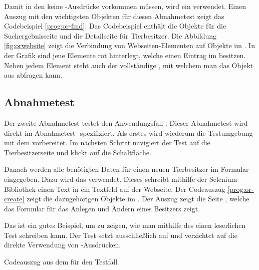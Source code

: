 \SuperPar
Damit in den  keine -Ausdrücke vorkommen müssen, wird ein  verwendet. Einen Auszug mit den wichtigsten Objekten für diesen Abnahmetest zeigt das Codebeispiel \ref{prog:or-find}. Das Codebeispiel enthält die Objekte für die Suchergebnisseite und die Detailseite für Tierbesitzer. Die Abbildung \ref{fig:orwebsite} zeigt die Verbindung von Webseiten-Elementen auf Objekte im . In der Grafik sind jene Elemente rot hinterlegt, welche einen Eintrag im  besitzen. Neben jedem Element steht auch der vollständige , mit welchem man das Objekt aus  abfragen kann.


\subsection{Abnahmetest }
\label{cha:TestenUA2}


Der zweite Abnahmetest testet den Anwendungsfall . Dieser Abnahmetest wird direkt im Abnahmetest- spezifiziert. Als erstes wird wiederum die Testumgebung mit dem   vorbereitet. Im nächsten Schritt navigiert der Test auf die Tierbesitzerseite und klickt auf die  Schaltfläche. 


\SuperPar
Danach werden alle benötigten Daten für einen neuen Tierbesitzer im Formular eingegeben. Dazu wird das   verwendet. Dieses  schreibt mithilfe der Selenium-Bibliothek einen Text in ein Textfeld auf der Webseite. Der Codeauszug \ref{prog:or-create} zeigt die dazugehörigen Objekte im . Der Auszug zeigt die Seite , welche das Formular für das Anlegen und Ändern eines Besitzers zeigt.

\SuperPar
Das   ist ein gutes Beispiel, um zu zeigen, wie man mithilfe des  einen leserlichen Test schreiben kann. Der Test setzt ausschließlich auf   und verzichtet auf die direkte Verwendung von -Ausdrücken. 

\begin{program}

\caption{Codeauszug aus dem  für den Testfall }
\label{prog:or-create}
\end{program}


